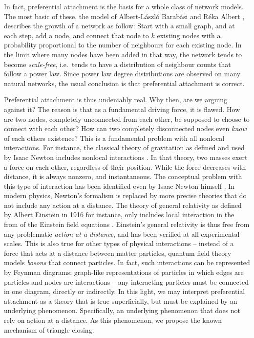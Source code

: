 \documentclass{acm_proc_article-sp}
\begin{document}
In fact, preferential attachment is the basis for a whole class of
network models.  The most basic of these, the model of Albert-László
Barabási and Réka Albert \cite{b439}, describes the growth of a network
as follow:  Start with a small graph, and at each step, add a node, and
connect that node to $k$ existing nodes with a probability proportional
to the number of neighbours for each existing node.  In the limit where
many nodes have been added in that way, the network tends to become
\emph{scale-free}, i.e.\ tends to have a distribution of neighbour counts
that follow a power law.  Since power law degree
distributions are observed on many natural networks, the usual conclusion
is that preferential attachment is correct. 

Preferential attachment is thus undeniably real.  Why then, are we
arguing against it?  The reason is that as a fundamental driving force,
it is flawed.  How are two nodes, completely unconnected from each
other, be supposed to choose to connect with each other?  How can two
completely disconnected nodes even \emph{know} of each others existence?
This is a fundamental problem with all nonlocal interactions.  For
instance, the classical theory of gravitation as defined and used by
Isaac Newton includes nonlocal interactions \cite{newton}.  In that
theory, two masses exert a force on each other, regardless of their
position.  While the force decreases with distance, it is always
nonzero, and instantaneous.  The conceptual problem with this type of
interaction has been identified even by Isaac Newton himself
\cite{hesse}.  In modern physics, Newton's formalism is replaced by more
precise theories that do not include any action at a distance.  The
theory of general relativity as defined by Albert Einstein in 1916 for
instance, only includes local interaction in the from of the Einstein
field equations \cite{einstein}.  Einstein's general relativity is
thus free from any problematic \emph{action at a distance}, and has been
verified at all experimental scales.  This is also true for
other types of physical interactions -- instead of a force that acts at
a distance between matter particles, quantum field theory models
\emph{bosons} that connect 
particles.  In fact, such interactions can be represented by Feynman
diagrams: graph-like representations of particles in which edges are
particles and nodes are interactions -- any interacting particles must
be connected in one diagram, directly or indirectly.  In this light, we
may interpret preferential attachment as a theory that is true
superficially, but must be explained by an underlying phenomenon.
Specifically, an underlying phenomenon that does not rely on action at a
distance.  As this phenomenon, we propose the known mechanism of
triangle closing.
\end{document}
